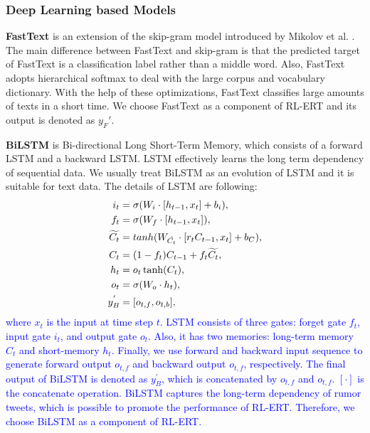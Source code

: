 \subsubsection{Deep Learning based Models}

\textbf{FastText} \cite{DBLP:journals/tacl/BojanowskiGJM17, DBLP:journals/corr/JoulinGBDJM16, DBLP:conf/eacl/GraveMJB17} is an extension of the skip-gram model introduced by Mikolov et al. \cite{DBLP:conf/nips/MikolovSCCD13}. The main difference between FastText and skip-gram is that the predicted target of FastText is a classification label rather than a middle word. Also, FastText adopts hierarchical softmax to deal with the large corpus and vocabulary dictionary. With the help of these optimizations, FastText classifies large amounts of texts in a short time. We choose FastText as a component of RL-ERT and its output is denoted as $y_F'$.

\textbf{BiLSTM} \cite{DBLP:journals/neco/HochreiterS97} is Bi-directional Long Short-Term Memory, which consists of a forward LSTM and a backward LSTM. LSTM effectively learns the long term dependency of sequential data. We usually treat BiLSTM as an evolution of LSTM and it is suitable for text data. The details of LSTM are following:
\begin{align}\label{eq:lstm}
i_t &= \sigma(W_i \cdot [h_{t-1}, x_t] + b_i),\\
f_t &= \sigma(W_f \cdot [h_{t-1}, x_t]),\\
\widetilde{C_t} &= tanh(W_{\tilde{C_t}} \cdot [r_t C_{t-1}, x_t]  + b_C),\\
C_t &= (1-f_t) C_{t-1} + f_t \widetilde{C_t},\\
h_t &=o_t \* \tanh(C_t),\\
o_t &=  \sigma(W_o \cdot h_t),\\
y_B^{'} &= [o_{t,f}, o_{t,b}],
\end{align}
\textcolor{blue}{where $x_t$ is the input at time step $t$. LSTM consists of three gates: forget gate $f_t$, input gate $i_t$, and output gate $o_t$. Also, it has two memories: long-term memory $C_t$ and short-memory $h_t$. Finally, we use forward and backward input sequence to generate forward output $o_{t,f}$ and backward output $o_{t,f}$, respectively. The final output of BiLSTM is denoted as $y_B^{'}$, which is concatenated by $o_{t,f}$ and $o_{t,f}$. $[\cdot]$ is the concatenate operation. BiLSTM captures the long-term dependency of rumor tweets, which is possible to promote the performance of RL-ERT. Therefore, we choose BiLSTM as a component of RL-ERT.}

